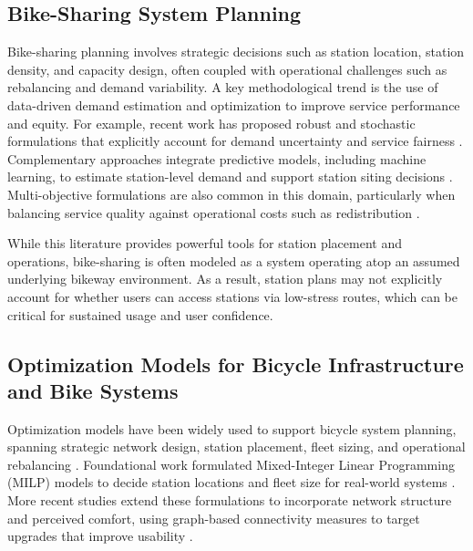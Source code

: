 \documentclass[preprint,authoryear,10pt]{elsarticle}
\begin{document}
\subsection{Bike-Sharing System Planning}

Bike-sharing planning involves strategic decisions such as station location, station density, and capacity design, often coupled with operational challenges such as rebalancing and demand variability. A key methodological trend is the use of data-driven demand estimation and optimization to improve service performance and equity. For example, recent work has proposed robust and stochastic formulations that explicitly account for demand uncertainty and service fairness \citep{chen2023target, nikiforiadis2021determining, jin2020Robustbikesharingstations}. Complementary approaches integrate predictive models, including machine learning, to estimate station-level demand and support station siting decisions \citep{7373406}. Multi-objective formulations are also common in this domain, particularly when balancing service quality against operational costs such as redistribution \citep{8932534, soriguera2020continuous}.

While this literature provides powerful tools for station placement and operations, bike-sharing is often modeled as a system operating atop an assumed underlying bikeway environment. As a result, station plans may not explicitly account for whether users can access stations via low-stress routes, which can be critical for sustained usage and user confidence.

\subsection{Optimization Models for Bicycle Infrastructure and Bike Systems}

Optimization models have been widely used to support bicycle system planning, spanning strategic network design, station placement, fleet sizing, and operational rebalancing \citep{laporte2018Sharedmobilitysystems, shui2020reviewbicyclesharingservice}. Foundational work formulated Mixed-Integer Linear Programming (MILP) models to decide station locations and fleet size for real-world systems \citep{lin2011Strategicdesignpublic, martinez2012OptimisationAlgorithmEstablish, frade2015Bikesharingstationsmaximal, garcia-palomaresOptimizingLocationStations2012}. More recent studies extend these formulations to incorporate network structure and perceived comfort, using graph-based connectivity measures to target upgrades that improve usability \citep{10920161}.
\end{document}
